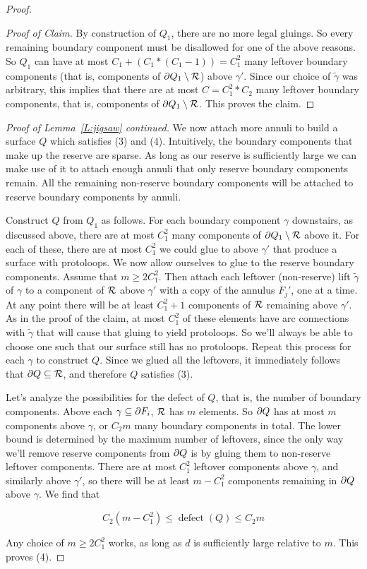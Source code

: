 \begin{proof}
\begin{proof}[Proof of Claim]
By construction of $Q_1$, there are no more legal gluings. So every remaining
boundary component must be disallowed for one of the above reasons. So $Q_1$
can have at most $C_1+(C_1*(C_1-1)) = C_1^2$ many leftover boundary components
(that is, components of $\partial Q_1 \setminus \mathcal{R}$) above $\gamma'$.  Since our
choice of $\widetilde{\gamma}$ was arbitrary, this implies that there are at
most $C = C_1^2*C_2$ many leftover boundary components, that is, components of
$\partial Q_1\setminus\mathcal{R}$. This proves the claim.

\end{proof}

\noindent \emph{Proof of Lemma~\ref{L:jigsaw} continued.} We now attach more
annuli to build a surface $Q$ which satisfies (3) and (4). Intuitively, the
boundary components that make up the reserve are sparse. As long as our reserve
is sufficiently large we can make use of it to attach enough annuli that only
reserve boundary components remain. All the remaining non-reserve boundary
components will be attached to reserve boundary components by annuli.

Construct $Q$ from $Q_1$ as follows.  For each boundary component $\gamma$
downstairs, as discussed above, there are at most $C_1^2$ many components of
$\partial Q_1 \setminus \mathcal{R}$ above it.  For each of these, there are at most $C_1^2$
we could glue to above $\gamma'$ that produce a surface with protoloops. We now
allow ourselves to glue to the reserve boundary components. Assume that $m\geq
2C_1^2$.  Then attach each leftover (non-reserve) lift $\widetilde{\gamma}$ of
$\gamma$ to a component of $\mathcal{R}$ above $\gamma'$ with a copy of the annulus
$F_j'$, one at a time.  At any point there will be at least $C_1^2+1$
components of $\mathcal{R}$ remaining above $\gamma'$. As in the proof of the claim, at
most $C_1^2$ of these elements have arc connections with $\widetilde{\gamma}$
that will cause that gluing to yield protoloops. So we'll always be able to
choose one such that our surface still has no protoloops.  Repeat this process
for each $\gamma$ to construct $Q$.  Since we glued all the leftovers, it
immediately follows that $\partial Q \subseteq \mathcal{R}$, and therefore $Q$ satisfies (3).

Let's analyze the possibilities for the defect of $Q$, that is, the number of
boundary components.  Above each $\gamma \subseteq \partial F_i$, $\mathcal{R}$ has $m$ elements.
So $\partial Q$ has at most $m$ components above $\gamma$, or $C_2m$ many boundary
components in total. The lower bound is determined by the maximum number of
leftovers, since the only way we'll remove reserve components from $\partial Q$ is
by gluing them to non-reserve leftover components. There are at most $C_1^2$
leftover components above $\gamma$, and similarly above $\gamma'$, so there
will be at least $m - C_1^2$ components remaining in $\partial Q$ above $\gamma$.
We find that

\[ C_2(m-C_1^2) \leq \operatorname{defect}(Q) \leq C_2m \]

Any choice of $m\geq 2C_1^2$ works, as long as $d$ is sufficiently large
relative to $m$.  This proves (4).

\end{proof}

